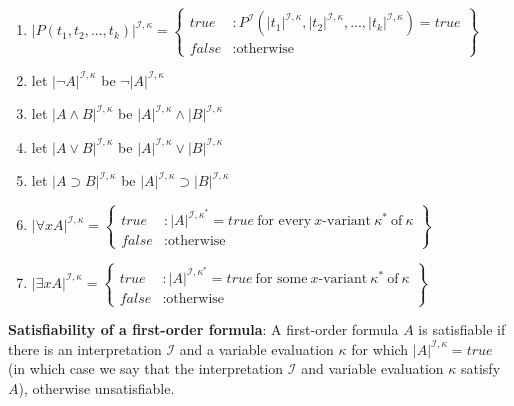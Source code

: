 \documentclass[margin=0px]{article}
\begin{document}
\begin{enumerate}
    \item	$|P(t_{1}, t_{2}, ..., t_{k})|^{\mathcal{I},\kappa} = \left\{
              \begin{array}{lr}
                  true  & : P^{\mathcal{I}}(|t_{1}|^{\mathcal{I},\kappa}, |t_{2}|^{\mathcal{I},\kappa}, ..., |t_{k}|^{\mathcal{I},\kappa}) = true \\
                  false & : \text{otherwise}
              \end{array}
              \right\}$

    \item	let $|\neg A|^{\mathcal{I},\kappa}$ be $\neg |A|^{\mathcal{I},\kappa}$

    \item	let $|A \wedge B|^{\mathcal{I},\kappa}$ be $|A|^{\mathcal{I},\kappa} \wedge |B|^{\mathcal{I},\kappa}$

    \item	let $|A \vee B|^{\mathcal{I},\kappa}$ be $|A|^{\mathcal{I},\kappa} \vee |B|^{\mathcal{I},\kappa}$

    \item	let $|A \supset B|^{\mathcal{I},\kappa}$ be $|A|^{\mathcal{I},\kappa} \supset |B|^{\mathcal{I},\kappa}$

    \item	$|\forall x A|^{\mathcal{I},\kappa} = \left\{
              \begin{array}{lr}
                  true  & : |A|^{\mathcal{I},\kappa^{*}} = true \ \text{for every} \ x\text{-variant} \ \kappa^{*} \ \text{of} \ \kappa \\
                  false & : \text{otherwise}
              \end{array}
              \right\}$

    \item	$|\exists x A|^{\mathcal{I},\kappa} = \left\{
              \begin{array}{lr}
                  true  & : |A|^{\mathcal{I},\kappa^{*}} = true \ \text{for some} \ x\text{-variant} \ \kappa^{*} \ \text{of} \ \kappa \\
                  false & : \text{otherwise}
              \end{array}
              \right\}$

\end{enumerate}

\noindent \textbf{Satisfiability of a first-order formula}: A first-order formula $A$ is satisfiable if there is
an interpretation $\mathcal{I}$ and a variable evaluation $\kappa$ for which $|A|^{\mathcal{I},\kappa} = true$
(in which case we say that the interpretation $\mathcal{I}$ and variable evaluation $\kappa$ satisfy $A$),
otherwise unsatisfiable.
\end{document}
